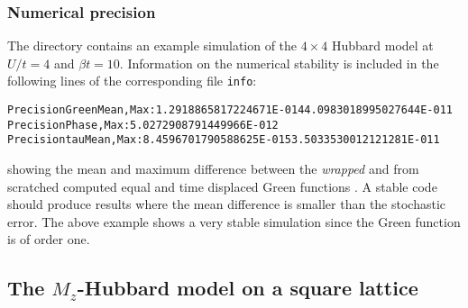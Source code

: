 \subsubsection{Numerical precision}\label{sec:prec_charge}
The directory   contains an example simulation of the $4 \times 4$ Hubbard model at $U/t=4$ and $\beta t = 10$. 
Information on the numerical stability is included in the following lines of the corresponding file \texttt{info}:
\begin{alltt}
Precision Green  Mean, Max :    1.2918865817224671E-014   4.0983018995027644E-011
Precision Phase, Max       :    5.0272908791449966E-012
Precision tau    Mean, Max :    8.4596701790588625E-015   3.5033530012121281E-011
\end{alltt}
showing the mean and maximum difference between the \textit{wrapped}  and from scratched computed equal and time displaced  Green functions \cite{Assaad08_rev}.
A stable code  should produce results where the mean difference is smaller than the  stochastic error. The above example  shows a very stable  simulation since the Green function  is of order one. 


\subsection{The $M_z$-Hubbard model on a square lattice}\label{sec:walk1.1}


